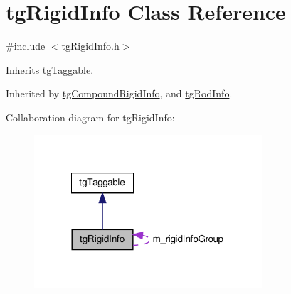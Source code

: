 \hypertarget{classtg_rigid_info}{\section{tg\-Rigid\-Info Class Reference}
\label{classtg_rigid_info}
}


{\ttfamily \#include $<$tg\-Rigid\-Info.\-h$>$}



Inherits \hyperlink{classtg_taggable}{tg\-Taggable}.



Inherited by \hyperlink{classtg_compound_rigid_info}{tg\-Compound\-Rigid\-Info}, and \hyperlink{classtg_rod_info}{tg\-Rod\-Info}.



Collaboration diagram for tg\-Rigid\-Info\-:\nopagebreak
\begin{figure}[H]
\begin{center}
\leavevmode
\includegraphics[width=240pt]{classtg_rigid_info__coll__graph}
\end{center}
\end{figure}
